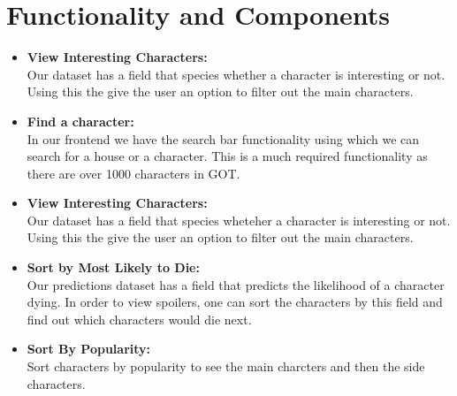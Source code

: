 \documentclass[]{article}
\begin{document}
\section{Functionality and Components}

\begin{itemize}
\item \textbf{View Interesting Characters:}\\
Our dataset has a field that species whether a character is interesting or not. Using this the give the user an option to filter out the main characters.

\item \textbf{Find a character:}\\
In our frontend we have the search bar functionality using which we can search for a house or a character. This is a much required functionality as there are over 1000 characters in GOT.

\item \textbf{View Interesting Characters:}\\
Our dataset has a field that species wheteher a character is interesting or not. Using this the give the user an option to filter out the main characters.

\item \textbf{Sort by Most Likely to Die:}\\
Our predictions dataset has a field that predicts the likelihood of a character dying. In order to view spoilers, one can sort the characters by this field and find out which characters would die next.

\item \textbf{Sort By Popularity:}\\
Sort characters by popularity to see the main charcters and then the side characters. 



\end{itemize}
\end{document}
